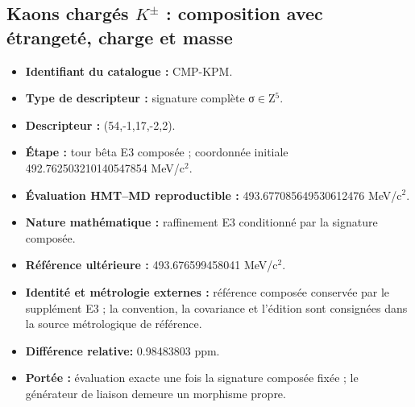 \subsection{Kaons chargés \(K^\pm\) : composition avec étrangeté, charge et masse}
\begin{itemize}
\item \textbf{Identifiant du catalogue :} CMP-KPM.
\item \textbf{Type de descripteur :} signature complète σ\(\in\)Z\({}^{5}\).
\item \textbf{Descripteur :} (54,-1,17,-2,2).
\item \textbf{Étape :} tour bêta E3 composée ; coordonnée initiale 492.762503\allowbreak{}210140\allowbreak{}547854 MeV/c\({}^{2}\).
\item \textbf{Évaluation HMT--MD reproductible :} 493.677085\allowbreak{}649530\allowbreak{}612476 MeV/c\({}^{2}\).
\item \textbf{Nature mathématique :} raffinement E3 conditionné par la signature composée.
\item \textbf{Référence ultérieure :} 493.676599\allowbreak{}458041 MeV/c\({}^{2}\).
\item \textbf{Identité et métrologie externes :} référence composée conservée par le supplément E3 ; la convention, la covariance et l’édition sont consignées dans la source métrologique de référence.
\item \textbf{Différence relative:} 0.984838\allowbreak{}03 ppm.
\item \textbf{Portée :} évaluation exacte une fois la signature composée fixée ; le générateur de liaison demeure un morphisme propre.
\end{itemize}
